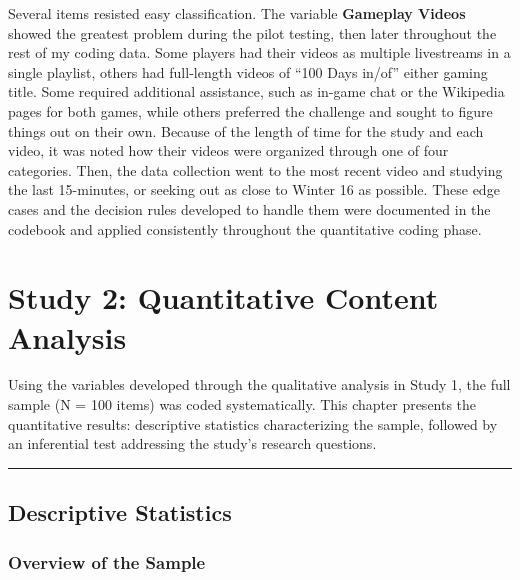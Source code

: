 \documentclass[
  12pt,
  letterpaper,
  DIV=11,
  numbers=noendperiod]{scrreprt}
\begin{document}
Several items resisted easy classification. The variable
\textbf{Gameplay Videos} showed the greatest problem during the pilot
testing, then later throughout the rest of my coding data. Some players
had their videos as multiple livestreams in a single playlist, others
had full-length videos of ``100 Days in/of'' either gaming title. Some
required additional assistance, such as in-game chat or the Wikipedia
pages for both games, while others preferred the challenge and sought to
figure things out on their own. Because of the length of time for the
study and each video, it was noted how their videos were organized
through one of four categories. Then, the data collection went to the
most recent video and studying the last 15-minutes, or seeking out as
close to Winter 16 as possible. These edge cases and the decision rules
developed to handle them were documented in the codebook and applied
consistently throughout the quantitative coding phase.


\chapter{Study 2: Quantitative Content
Analysis}\label{study-2-quantitative-content-analysis}

Using the variables developed through the qualitative analysis in Study
1, the full sample (N = 100 items) was coded systematically. This
chapter presents the quantitative results: descriptive statistics
characterizing the sample, followed by an inferential test addressing
the study's research questions.

\begin{center}\rule{0.5\linewidth}{0.5pt}\end{center}

\section{Descriptive Statistics}\label{descriptive-statistics}

\subsection{Overview of the Sample}\label{overview-of-the-sample}

\begingroup\fontsize{13}{15}\selectfont
\end{document}
